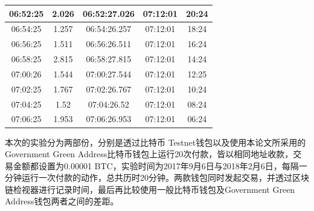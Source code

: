 \begin{table}[!htbp]
\begin{tabular}{|c|c|c|c|c|}
			06:52:25 & 2.026 & 06:52:27.026 & 07:12:01 & 20:24 \\ \hline
			06:54:25 & 1.257 & 06:54:26.257 & 07:12:01 & 18:24 \\ \hline
			06:56:25 & 1.511 & 06:56:26.511 & 07:12:01 & 16:24 \\ \hline
			06:58:25 & 2.815 & 06:58:27.815 & 07:12:01 & 14:24 \\ \hline
			07:00:26 & 1.544 & 07:00:27.544 & 07:12:01 & 12:25 \\ \hline
			07:02:25 & 1.767 & 07:02:26.767 & 07:12:01 & 10:24 \\ \hline
			07:04:25 & 1.52 & 07:04:26.52 & 07:12:01 & 08:24 \\ \hline
			07:06:25 & 1.953 & 07:06:26.953 & 07:12:01 & 06:24 \\ \hline
			\end{tabular}
			\end{table}


		本次的实验分为两部份，分别是透过比特币 Testnet钱包以及使用本论文所采用的Government Green Address比特币钱包上运行20次付款，皆以相同地址收款，交易金额都设置为0.00001 BTC，实验时间为2017年9月6日与2018年2月6日，每隔一分钟运行一次付款的动作，总共历时20分钟。两款钱包同时发起交易，并透过区块链检视器进行记录时间，最后再比较使用一般比特币钱包及Government Green Address钱包两者之间的差距。

